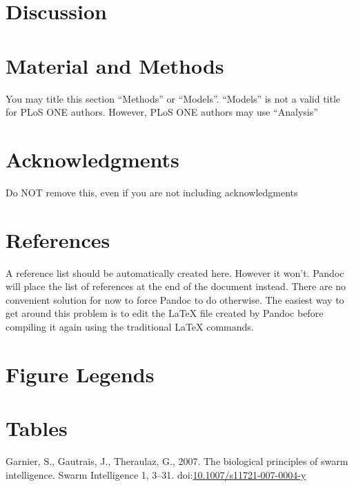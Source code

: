 \documentclass[10pt]{article}
\begin{document}
\section*{Discussion}\label{discussion}

\section*{Material and Methods}\label{material-and-methods}

You may title this section ``Methods'' or ``Models''. ``Models'' is not
a valid title for PLoS ONE authors. However, PLoS ONE authors may use
``Analysis''

\section*{Acknowledgments}\label{acknowledgments}

Do NOT remove this, even if you are not including acknowledgments

\section*{References}\label{references}

A reference list should be automatically created here. However it won't.
Pandoc will place the list of references at the end of the document
instead. There are no convenient solution for now to force Pandoc to do
otherwise. The easiest way to get around this problem is to edit the
LaTeX file created by Pandoc before compiling it again using the
traditional LaTeX commands.

\section*{Figure Legends}\label{figure-legends}

\section*{Tables}\label{tables}

Garnier, S., Gautrais, J., Theraulaz, G., 2007. The biological
principles of swarm intelligence. Swarm Intelligence 1, 3--31.
doi:\href{http://dx.doi.org/10.1007/s11721-007-0004-y}{10.1007/s11721-007-0004-y}
\end{document}
